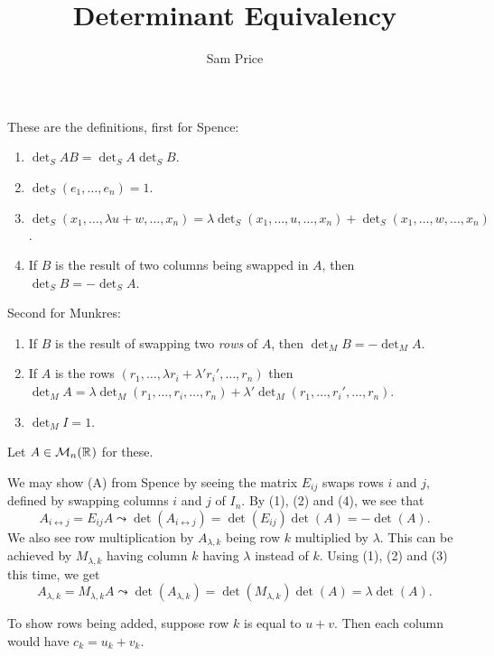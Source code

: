 \documentclass{article}
\author{Sam Price}
\title{Determinant Equivalency}
\begin{document}
\maketitle

These are the definitions, first for Spence:
\begin{enumerate}
  \item $\det_{S} AB = \det_{S}A \det_{S}B$.
  \item $\det_{S} (e_{1}, \ldots, e_{n}) = 1$.
  \item $\det_{S} (x_{1}, \ldots, \lambda u + w, \ldots, x_{n}) = \lambda \det_{S} (x_{1}, \ldots, u, \ldots, x_{n}) + \det_{S} (x_{1}, \ldots, w, \ldots, x_{n})$.
  \item If $B$ is the result of two columns being swapped in $A$, then $\det_{S} B = -\det_{S} A$.
\end{enumerate}
Second for Munkres:
\begin{enumerate}[label=\Alph*.]
  \item If $B$ is the result of swapping two \emph{rows} of $A$, then $\det_{M} B = - \det_{M} A$.
  \item If $A$ is the rows $(r_{1}, \ldots, \lambda r_{i} + \lambda' r_{i}', \ldots, r_{n})$ then
        $\det_{M} A = \lambda\det_{M} (r_{1}, \ldots, r_{i}, \ldots, r_{n}) + \lambda' \det_{M} (r_{1}, \ldots, r_{i}', \ldots, r_{n})$.
  \item $\det_{M} I = 1$.
\end{enumerate}

Let $A \in \mathcal{M}_{n}(\mathbb{R}^{})$ for these.

We may show (A) from Spence by seeing the matrix $E_{ij}$ swaps rows $i$ and $j$, defined by
swapping columns $i$ and $j$ of $I_{n}$. By (1), (2) and (4), we see that
\[ A_{i \leftrightarrow j} = E_{ij}A \leadsto \det(A_{i \leftrightarrow j}) = \det(E_{ij})\det(A) = -\det(A). \]
We also see row multiplication by $A_{\lambda,k}$ being row $k$ multiplied by $\lambda$.
This can be achieved by $M_{\lambda,k}$ having column $k$ having $\lambda$ instead of $k$.
Using (1), (2) and (3) this time, we get
\[ A_{\lambda,k} = M_{\lambda,k}A \leadsto \det(A_{\lambda,k}) = \det(M_{\lambda,k})\det(A) = \lambda\det(A). \]

To show rows being added, suppose row $k$ is equal to $u + v$.
Then each column would have $c_{k} = u_{k} + v_{k}$.
\end{document}

